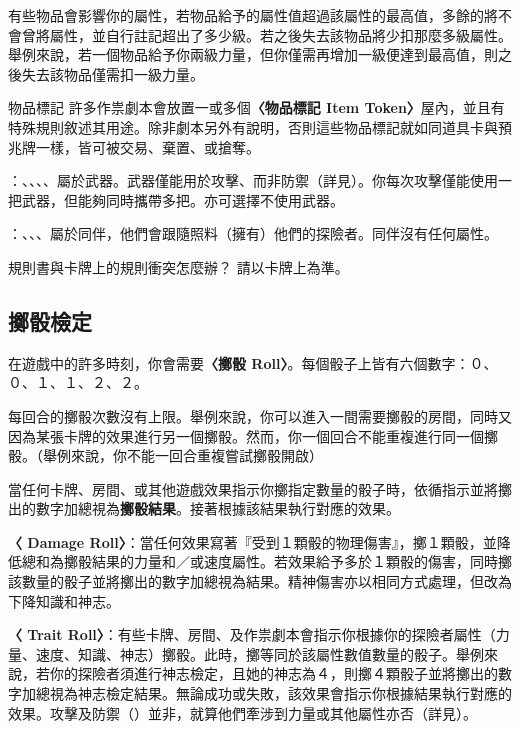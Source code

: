 有些物品會影響你的屬性，若物品給予的屬性值超過該屬性的最高值，多餘的將不會曾將屬性，並自行註記超出了多少級。若之後失去該物品將少扣那麼多級屬性。舉例來說，若一個物品給予你兩級力量，但你僅需再增加一級便達到最高值，則之後失去該物品僅需扣一級力量。

\begin{RuleBox}{物品標記}
許多作祟劇本會放置一或多個\textbf{〈物品標記 Item Token〉}屋內，並且有特殊規則敘述其用途。除非劇本另外有說明，否則這些物品標記就如同道具卡與預兆牌一樣，皆可被交易、棄置、或搶奪。
\end{RuleBox}

\textbf{}：、、、、屬於武器。武器僅能用於攻擊、而非防禦（詳見）。你每次攻擊僅能使用一把武器，但能夠同時攜帶多把。亦可選擇不使用武器。

\textbf{}：、、、屬於同伴，他們會跟隨照料（擁有）他們的探險者。同伴沒有任何屬性。

\begin{RuleBox}{規則書與卡牌上的規則衝突怎麼辦？}
  請以卡牌上為準。
\end{RuleBox}


\subsection{擲骰檢定} \label{ssec:attempt-a-die-roll}

在遊戲中的許多時刻，你會需要\textbf{〈擲骰 Roll〉}。每個骰子上皆有六個數字：０、０、１、１、２、２。

每回合的擲骰次數沒有上限。舉例來說，你可以進入一間需要擲骰的房間，同時又因為某張卡牌的效果進行另一個擲骰。然而，你一個回合不能重複進行同一個擲骰。（舉例來說，你不能一回合重複嘗試擲骰開啟）

當任何卡牌、房間、或其他遊戲效果指示你擲指定數量的骰子時，依循指示並將擲出的數字加總視為\textbf{擲骰結果}。接著根據該結果執行對應的效果。

\textbf{〈 Damage Roll〉}：當任何效果寫著『受到１顆骰的物理傷害』，擲１顆骰，並降低總和為擲骰結果的力量和／或速度屬性。若效果給予多於１顆骰的傷害，同時擲該數量的骰子並將擲出的數字加總視為結果。精神傷害亦以相同方式處理，但改為下降知識和神志。

\textbf{〈 Trait Roll〉}：有些卡牌、房間、及作祟劇本會指示你根據你的探險者屬性（力量、速度、知識、神志）擲骰。此時，擲等同於該屬性數值數量的骰子。舉例來說，若你的探險者須進行神志檢定，且她的神志為４，則擲４顆骰子並將擲出的數字加總視為神志檢定結果。無論成功或失敗，該效果會指示你根據結果執行對應的效果。攻擊及防禦（）並非，就算他們牽涉到力量或其他屬性亦否（詳見）。

